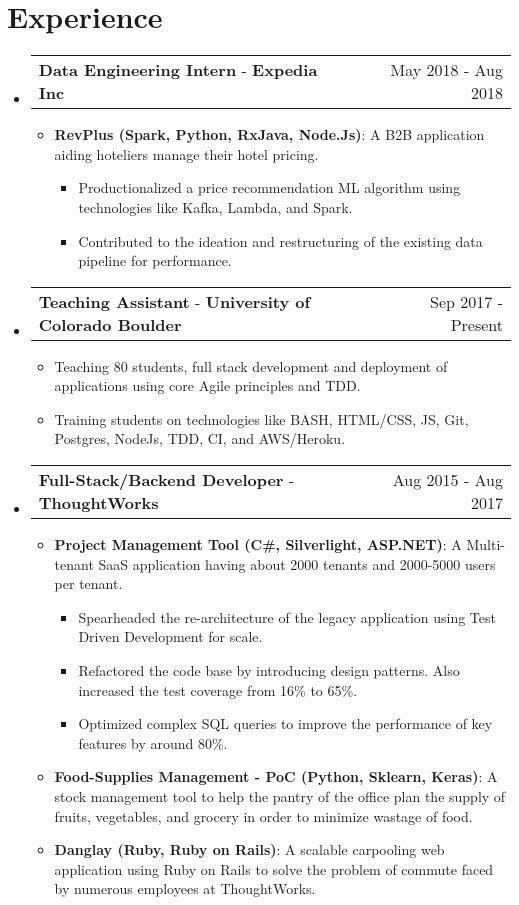 \documentclass[letterpaper,11pt]{article}
\makeatletter
\newcommand{\resumeItem}[2]{
  \linespread{1.1}
	\item\small{
    	\textbf{#1}{: #2}
  	}
}
\newcommand{\resumePoint}[1]{
	\linespread{1.2}
	\item\small{#1}
}
\newcommand{\resumeExperienceSubheading}[5]{
    \vspace{-3pt}\item
    \begin{tabular*}{0.97\textwidth}{l@{\extracolsep{\fill}}r}
      \textbf{#1} \normalfont{\small#2} - \textbf{#3}\normalfont{#4} & #5 \\
    \end{tabular*}\vspace{-4pt}
}
\newcommand{\resumeSubHeadingListStart}{\begin{itemize}[leftmargin=*]}
\newcommand{\resumeSubHeadingListEnd}{\end{itemize}\vspace{-14pt}}
\newcommand{\resumeItemListStart}{\begin{itemize}}
\newcommand{\resumeItemListEnd}{\end{itemize}\vspace{-2pt}}
\newcommand{\resumeInnerItemListStart}{\begin{itemize}\vspace{-1pt}}
\newcommand{\resumeInnerItemListEnd}{\end{itemize}\vspace{2pt}}
\makeatother
\begin{document}
\section{Experience}
  \resumeSubHeadingListStart
  \resumeExperienceSubheading
      {Data Engineering Intern}{}{Expedia Inc}{, Chicago, USA}{May 2018 - Aug 2018}
      \resumeItemListStart
          \resumeItem {RevPlus (Spark, Python, RxJava, Node.Js)}
          {A B2B application aiding hoteliers manage their hotel pricing.}
          \resumeInnerItemListStart
            \resumePoint{Productionalized a price recommendation ML algorithm using technologies like Kafka, Lambda, and Spark.}
            \resumePoint{Contributed to the ideation and restructuring of the existing data pipeline for performance.}
          \resumeInnerItemListEnd
      \resumeItemListEnd
    \vspace{-5pt}
    \resumeExperienceSubheading
      {Teaching Assistant}{\href{https://www.colorado.edu/cs/csci-3308-software-development-methods-and-tools}{(S/W Dev Methods \& Tools)}}{University of Colorado Boulder}{}{Sep 2017 - Present}
      \resumeItemListStart
          \resumePoint{Teaching 80 students, full stack development and deployment of applications using core Agile principles and TDD.}
          \resumePoint{Training students on technologies like BASH, HTML/CSS, JS, Git, Postgres, NodeJs, TDD, CI, and AWS/Heroku.}
      \resumeItemListEnd
    \resumeExperienceSubheading
      {Full-Stack/Backend Developer}{}{ThoughtWorks}{, Bangalore, India}{Aug 2015 - Aug 2017}
      \resumeItemListStart
      \resumeItem {Project Management Tool (C\#, Silverlight, ASP.NET)}
          {A Multi-tenant SaaS application having about 2000 tenants and 2000-5000 users per tenant.}
          \resumeInnerItemListStart
            \resumePoint {Spearheaded the re-architecture of the legacy application using Test Driven Development for scale.}
            \resumePoint {Refactored the code base by introducing design patterns. Also increased the test coverage from 16\% to 65\%.}
            \resumePoint {Optimized complex SQL queries to improve the performance of key features by around 80\%.}
          \resumeInnerItemListEnd
        \resumeItem {Food-Supplies Management - PoC (Python, Sklearn, Keras)}{A stock management tool to help the pantry of the office plan the supply of fruits, vegetables, and grocery in order to minimize wastage of food.}
      \resumeItem {Danglay (Ruby, Ruby on Rails)}{A scalable carpooling web application using Ruby on Rails to solve the problem of commute faced by numerous employees at ThoughtWorks.}
      \resumeItemListEnd
  \resumeSubHeadingListEnd
\end{document}

